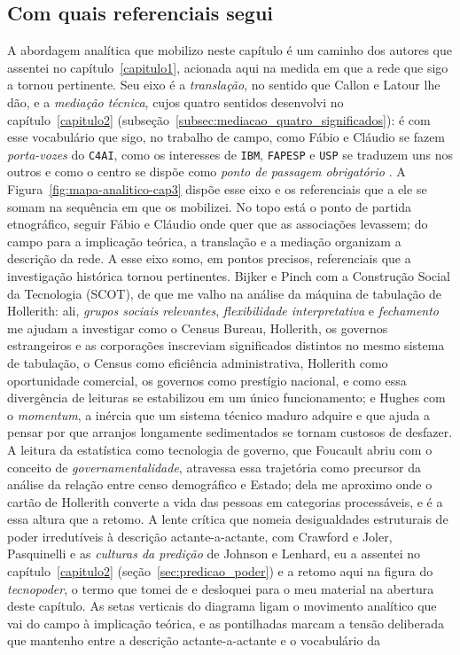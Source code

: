 \subsection{Com quais referenciais segui}
\label{sec:referenciais_cap3}

A abordagem analítica que mobilizo neste capítulo é um caminho dos autores que assentei no capítulo~\ref{capitulo1}, acionada aqui na medida em que a rede que sigo a tornou pertinente. Seu eixo é a \textit{translação}, no sentido que Callon e Latour lhe dão, e a \textit{mediação técnica}, cujos quatro sentidos desenvolvi no capítulo~\ref{capitulo2} (subseção~\ref{subsec:mediacao_quatro_significados}): é com esse vocabulário que sigo, no trabalho de campo, como Fábio e Cláudio se fazem \textit{porta-vozes} do \texttt{C4AI}, como os interesses de \texttt{IBM}, \texttt{FAPESP} e \texttt{USP} se traduzem uns nos outros e como o centro se dispõe como \textit{ponto de passagem obrigatório} \parencite{Callon1984Some, Callon1986Elements, Callon1991Techno, Latour2011CienciaEmAcao, Latour2017Esperanca}. A Figura~\ref{fig:mapa-analitico-cap3} dispõe esse eixo e os referenciais que a ele se somam na sequência em que os mobilizei. No topo está o ponto de partida etnográfico, seguir Fábio e Cláudio onde quer que as associações levassem; do campo para a implicação teórica, a translação e a mediação organizam a descrição da rede. A esse eixo somo, em pontos precisos, referenciais que a investigação histórica tornou pertinentes. Bijker e Pinch \parencite{Bijker2012Social} com a Construção Social da Tecnologia (SCOT), de que me valho na análise da máquina de tabulação de Hollerith: ali, \textit{grupos sociais relevantes}, \textit{flexibilidade interpretativa} e \textit{fechamento} me ajudam a investigar como o Census Bureau, Hollerith, os governos estrangeiros e as corporações inscreviam significados distintos no mesmo sistema de tabulação, o Census como eficiência administrativa, Hollerith como oportunidade comercial, os governos como prestígio nacional, e como essa divergência de leituras se estabilizou em um único funcionamento; e Hughes \parencite{Hughes1987Momentum} com o \textit{momentum}, a inércia que um sistema técnico maduro adquire e que ajuda a pensar por que arranjos longamente sedimentados se tornam custosos de desfazer. A leitura da estatística como tecnologia de governo, que Foucault abriu com o conceito de \textit{governamentalidade}, atravessa essa trajetória como precursor da análise da relação entre censo demográfico e Estado; dela me aproximo onde o cartão de Hollerith converte a vida das pessoas em categorias processáveis, e é a essa altura que a retomo. A lente crítica que nomeia desigualdades estruturais de poder irredutíveis à descrição actante-a-actante, com Crawford e Joler, Pasquinelli e as \textit{culturas da predição} de Johnson e Lenhard, eu a assentei no capítulo~\ref{capitulo2} (seção~\ref{sec:predicao_poder}) e a retomo aqui na figura do \textit{tecnopoder}, o termo que tomei de \textcite{Brennan2025ArtificialPower} e desloquei para o meu material na abertura deste capítulo. As setas verticais do diagrama ligam o movimento analítico que vai do campo à implicação teórica, e as pontilhadas marcam a tensão deliberada que mantenho entre a descrição actante-a-actante e o vocabulário da 